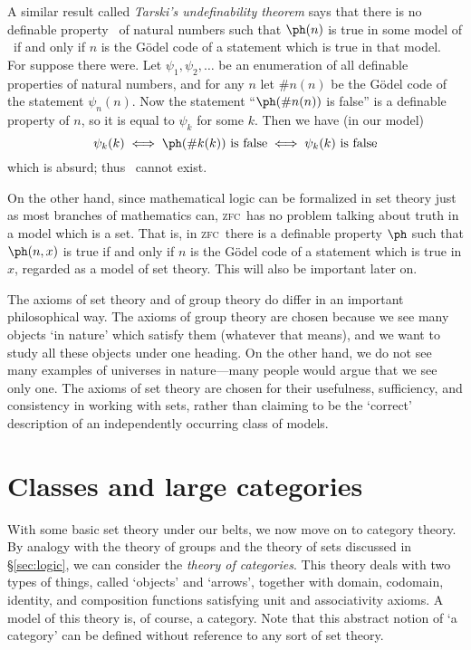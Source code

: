 \documentclass[12pt]{amsart}
\def\zfc{\textsc{zfc}}
\begin{document}
A similar result called \emph{Tarski's undefinability theorem} says
that there is no definable property \ph\ of natural numbers such that
$\ph(n)$ is true in some model of \cT\ if and only if $n$ is the
G\"odel code of a statement which is true in that model.  For suppose
there were.  Let $\psi_1,\psi_2,\dots$ be an enumeration of all
definable properties of natural numbers, and for any $n$ let $\#n(n)$
be the G\"odel code of the statement $\psi_n(n)$.  Now the statement
``$\ph(\#n(n))$ is false'' is a definable property of $n$, so it is
equal to $\psi_k$ for some $k$.  Then we have (in our model)
\[\psi_k(k) \iff \ph(\#k(k)) \text{ is false} \iff \psi_k(k) \text{ is
  false}\] which is absurd; thus \ph\ cannot exist.

On the other hand, since mathematical logic can be formalized in set
theory just as most branches of mathematics can, \zfc\ has no
problem talking about truth in a model which is a set.  That is, in
\zfc\ there is a definable property $\ph$ such that $\ph(n,x)$ is true
if and only if $n$ is the G\"odel code of a statement which is true in
$x$, regarded as a model of set theory.  This will also be important
later on.

\begin{rmk}
  The axioms of set theory and of group theory do differ in an
  important philosophical way.  The axioms of group theory are chosen
  because we see many objects `in nature' which satisfy them (whatever
  that means), and we want to study all these objects under one
  heading.  On the other hand, we do not see many examples of
  universes in nature---many people would argue that we see only one.
  The axioms of set theory are chosen for their usefulness,
  sufficiency, and consistency in working with sets, rather than
  claiming to be the `correct' description of an independently
  occurring class of models.
\end{rmk}


\section{Classes and large categories}
\label{sec:classes}

With some basic set theory under our belts, we now move on to category
theory.  By analogy with the theory of groups and the theory of sets
discussed in \S\ref{sec:logic}, we can consider the \emph{theory of
  categories}.  This theory deals with two types of things, called
`objects' and `arrows', together with domain, codomain, identity, and
composition functions satisfying unit and associativity axioms.  A
model of this theory is, of course, a category.  Note that this
abstract notion of `a category' can be defined without reference to
any sort of set theory.
\end{document}
